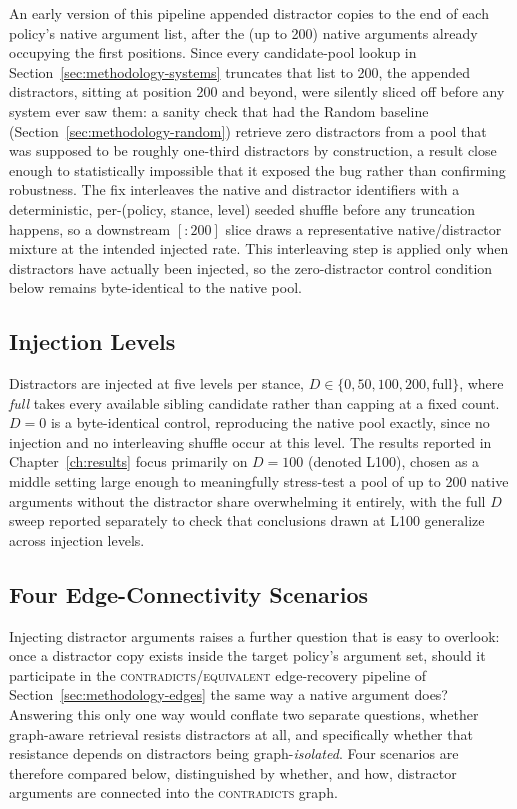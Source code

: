 An early version of this pipeline appended distractor copies to the end of each policy's native
argument list, after the (up to 200) native arguments already occupying the first positions. Since
every candidate-pool lookup in Section~\ref{sec:methodology-systems} truncates that list to 200,
the appended distractors, sitting at position 200 and beyond, were silently sliced off before any
system ever saw them: a sanity check that had the Random baseline (Section~\ref{sec:methodology-random})
retrieve zero distractors from a pool that was supposed to be roughly one-third distractors by
construction, a result close enough to statistically impossible that it exposed the bug rather
than confirming robustness. The fix interleaves the native and distractor identifiers with a
deterministic, per-(policy, stance, level) seeded shuffle before any truncation happens, so a
downstream $[:200]$ slice draws a representative native/distractor mixture at the intended
injected rate. This interleaving step is applied only when distractors have actually been
injected, so the zero-distractor control condition below remains byte-identical to the native
pool.

\subsection{Injection Levels}
\label{sec:methodology-hardened-levels}

Distractors are injected at five levels per stance, $D \in \{0, 50, 100, 200, \text{full}\}$, where
\emph{full} takes every available sibling candidate rather than capping at a fixed count. $D=0$ is
a byte-identical control, reproducing the native pool exactly, since no injection and no
interleaving shuffle occur at this level. The results reported in Chapter~\ref{ch:results} focus
primarily on $D=100$ (denoted L100), chosen as a middle setting large enough to meaningfully
stress-test a pool of up to 200 native arguments without the distractor share overwhelming it
entirely, with the full $D$ sweep reported separately to check that conclusions drawn at L100
generalize across injection levels.

\subsection{Four Edge-Connectivity Scenarios}
\label{sec:methodology-hardened-scenarios}

Injecting distractor arguments raises a further question that is easy to overlook: once a
distractor copy exists inside the target policy's argument set, should it participate in the
\textsc{contradicts}/\textsc{equivalent} edge-recovery pipeline of Section~\ref{sec:methodology-edges}
the same way a native argument does? Answering this only one way would conflate two separate
questions, whether graph-aware retrieval resists distractors at all, and specifically whether that
resistance depends on distractors being graph-\emph{isolated}. Four scenarios are therefore
compared below, distinguished by whether, and how, distractor arguments are connected into the
\textsc{contradicts} graph.

